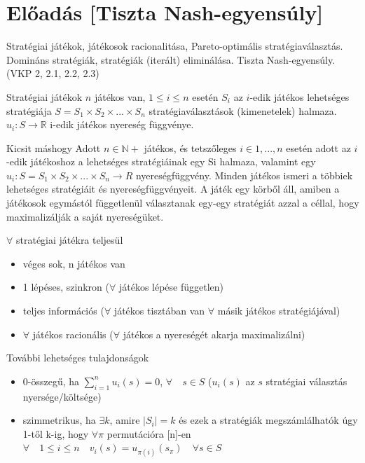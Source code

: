 	\newpage
	\section{Előadás [Tiszta Nash-egyensúly]}
	Stratégiai játékok, játékosok racionalitása, Pareto-optimális stratégiaválasztás. Domináns stratégiák, stratégiák (iterált) eliminálása. Tiszta Nash-egyensúly. (VKP 2, 2.1, 2.2, 2.3)
	\begin{definition}{Stratégiai játékok}{}
		$n$ játékos van, $1\leq i \leq n$ esetén $S_i$ az $i$-edik játékos lehetséges stratégiája $S = S_1 \times S_2 \times ...  \times S_n$ stratégiaválasztások (kimenetelek) halmaza.\\
		$u_i : S \longrightarrow \mathbb{R}$ i-edik játékos nyereség függvénye.
	\end{definition}
	
	\begin{remark}{Kicsit máshogy}{}
		Adott $n \in \mathbb{N}+$ játékos, és tetszőleges $i \in {1, . . . , n}$ esetén adott az $i$-edik játékoshoz
		a lehetséges stratégiáinak egy Si halmaza, valamint egy $u_i : S = S_1 \times S_2 \times ...  \times S_n \rightarrow R$ nyereségfüggvény. Minden játékos ismeri a többiek lehetséges stratégiáit és nyereségfüggvényeit. A játék egy körből
		áll, amiben a játékosok egymástól függetlenül választanak egy-egy stratégiát azzal a céllal, hogy
		maximalizálják a saját nyereségüket.
	\end{remark}
	
	$\forall$ stratégiai játékra teljesül
	\begin{itemize}
		\item véges sok, n játékos van
		\item 1 lépéses, szinkron ($\forall$ játékos lépése független)
		\item teljes információs ($\forall$ játékos tisztában van  $\forall$ másik játékos stratégiájával)
		\item $\forall$ játékos racionális ($\forall$ játékos a nyereségét akarja maximalizálni)
	\end{itemize}
	
	További lehetséges tulajdonságok
	\begin{itemize}
		\item 0-összegű, ha $\sum_{i=1}^{n}{}u_i(s) = 0$,  $\forall \quad s \in S$ ($u_i(s)$ az $s$ stratégiai választás nyersége/költsége)
		\item szimmetrikus, ha $\exists k$, amire $|S_i|= k$ és ezek a stratégiák megszámlálhatók úgy 1-től k-ig, hogy $\forall \pi$ permutációra [n]-en $\forall \quad 1\leq i \leq n \quad v_i(s)=u_{\pi (i)}(s_{\pi}) \quad \forall s \in S$
	\end{itemize}
	
